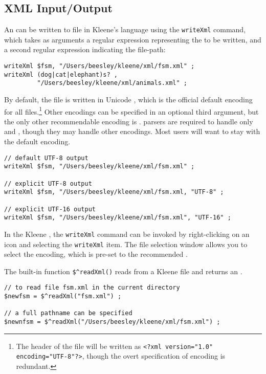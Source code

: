 \subsection{XML Input/Output}

An \fsm{} can be written to file in Kleene's 
 language using the \texttt{writeXml} command,
which takes as arguments a regular expression representing the \fsm{} to be
written, and a second regular expression indicating the file-path:

\begin{Verbatim}
writeXml $fsm, "/Users/beesley/kleene/xml/fsm.xml" ;
writeXml (dog|cat|elephant)s? , 
         "/Users/beesley/kleene/xml/animals.xml" ;
\end{Verbatim}

By default, the file is written in Unicode , which is the
official default encoding for all  files.\footnote{The
 header of the file will be written as \texttt{<?xml
version="1.0" encoding="UTF-8"?>}, though the overt specification of
 encoding is redundant.}  Other encodings can be specified in
an optional third argument, but the only other recommendable encoding is
.   parsers are required to handle only
 and , though they may handle other encodings.
Most users will want to stay with the default  encoding.

\begin{Verbatim}
// default UTF-8 output
writeXml $fsm, "/Users/beesley/kleene/xml/fsm.xml" ;

// explicit UTF-8 output
writeXml $fsm, "/Users/beesley/kleene/xml/fsm.xml, "UTF-8" ;

// explicit UTF-16 output
writeXml $fsm, "/Users/beesley/kleene/xml/fsm.xml", "UTF-16" ;
\end{Verbatim}

In the Kleene , the \verb!writeXml! command can be invoked by
right-clicking on an \fsm{} icon and selecting the \verb!writeXml!
item.  The file selection window allows you to select the encoding,
which is pre-set to the recommended .

The built-in function \verb!$^readXml()! reads from a Kleene  file and returns an
\fsm{}.

\begin{Verbatim}
// to read file fsm.xml in the current directory
$newfsm = $^readXml("fsm.xml") ;

// a full pathname can be specified
$newnfsm = $^readXml("/Users/beesley/kleene/xml/fsm.xml") ;
\end{Verbatim}


